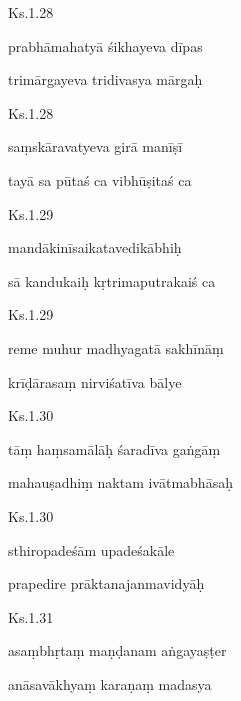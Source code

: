 \documentclass{tufte-handout}
\newenvironment{sanskrit}%
{\begin{otherlanguage}{sanskrit-devanagari}}%
{\end{otherlanguage}}
\begin{document}
    
	\begin{sanskrit}
	
	    
		Ks.1.28 
    
	    
		prabhāmahatyā śikhayeva dīpas 
    
	    
		trimārgayeva tridivasya mārgaḥ 
    
	\end{sanskrit}

    
	\begin{sanskrit}
	
	    
		Ks.1.28 
    
	    
		saṃskāravatyeva girā manīṣī 
    
	    
		tayā sa pūtaś ca vibhūṣitaś ca 
    
	\end{sanskrit}

    
	\begin{sanskrit}
	
	    
		Ks.1.29 
    
	    
		mandākinīsaikatavedikābhiḥ 
    
	    
		sā kandukaiḥ kṛtrimaputrakaiś ca 
    
	\end{sanskrit}

    
	\begin{sanskrit}
	
	    
		Ks.1.29 
    
	    
		reme muhur madhyagatā sakhīnāṃ 
    
	    
		krīḍārasaṃ nirviśatīva bālye 
    
	\end{sanskrit}

    
	\begin{sanskrit}
	
	    
		Ks.1.30 
    
	    
		tāṃ haṃsamālāḥ śaradīva gaṅgāṃ 
    
	    
		mahauṣadhiṃ naktam ivātmabhāsaḥ 
    
	\end{sanskrit}

    
	\begin{sanskrit}
	
	    
		Ks.1.30 
    
	    
		sthiropadeśām upadeśakāle 
    
	    
		prapedire prāktanajanmavidyāḥ 
    
	\end{sanskrit}

    
	\begin{sanskrit}
	
	    
		Ks.1.31 
    
	    
		asaṃbhṛtaṃ maṇḍanam aṅgayaṣṭer 
    
	    
		anāsavākhyaṃ karaṇaṃ madasya 
    
	\end{sanskrit}
\end{document}
